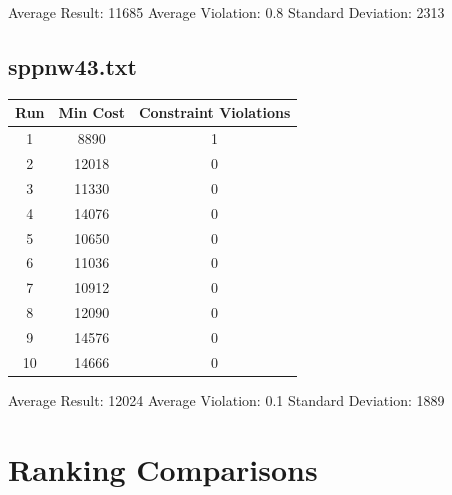 \documentclass{article}
\begin{document}
Average Result: 11685
\smallbreak
Average Violation: 0.8
\smallbreak
Standard Deviation: 2313

\subsection{sppnw43.txt}

\begin{center}
\begin{tabular}{ |c|c|c| } 
 \hline
Run & Min Cost & Constraint Violations \\ 
 \hline
 1 & 8890 & 1 \\ 
 \hline
 2 & 12018 & 0 \\ 
 \hline
 3 & 11330 & 0 \\ 
 \hline
 4 & 14076 & 0 \\ 
 \hline
 5 & 10650 & 0 \\ 
 \hline
 6 & 11036 & 0 \\ 
 \hline
 7 & 10912 & 0 \\  
 \hline
 8 & 12090 & 0 \\ 
 \hline
 9 & 14576 & 0 \\ 
 \hline
 10 & 14666 & 0 \\ 
 \hline
\end{tabular}
\end{center}

Average Result: 12024
\smallbreak
Average Violation: 0.1
\smallbreak
Standard Deviation: 1889

\section{Ranking Comparisons}
\end{document}
